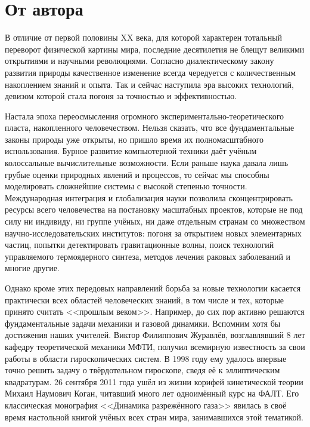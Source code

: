 \documentclass[a4paper, 12pt, oneside]{article} %
\begin{document}

\tableofcontents
\newrefsection[first]

\section*{От автора} 

В отличие от первой половины XX века, для которой характерен тотальный
переворот физической картины мира, последние десятилетия не блещут
великими открытиями и научными революциями. Согласно диалектическому
закону развития природы качественное изменение всегда чередуется с
количественным накоплением знаний и опыта. Так и сейчас наступила эра
высоких технологий, девизом которой стала погоня за точностью и
эффективностью.

Настала эпоха переосмысления огромного экспериментально-теоретического
пласта, накопленного человечеством. Нельзя сказать, что все
фундаментальные законы природы уже открыты, но пришло время их
полномасштабного использования. Бурное развитие компьютерной техники
даёт учёным колоссальные вычислительные возможности. Если раньше наука
давала лишь грубые оценки природных явлений и процессов, то сейчас мы
способны моделировать сложнейшие системы с высокой степенью точности.
Международная интеграция и глобализация науки позволила сконцентрировать
ресурсы всего человечества на постановку масштабных проектов,  которые
не под силу ни индивиду, ни группе учёных, ни даже отдельным странам со
множеством научно-исследовательских институтов: погоня за открытием
новых элементарных частиц, попытки детектировать гравитационные волны,
поиск технологий управляемого термоядерного синтеза, методов лечения
раковых заболеваний и многие другие.

Однако кроме этих передовых направлений борьба за новые технологии
касается практически всех областей человеческих знаний, в том числе и
тех, которые принято считать <<прошлым веком>>. Например, до сих пор
активно решаются фундаментальные задачи механики и газовой динамики.
Вспомним хотя бы достижения наших учителей. Виктор Филиппович Журавлёв,
возглавлявший 8 лет кафедру теоретической механики МФТИ, получил
всемирную известность за свои работы в области гироскопических систем. В
1998 году ему удалось впервые точно решить задачу о твёрдотельном
гироскопе, сведя её к эллиптическим квадратурам. 26 сентября 2011 года
ушёл из жизни корифей кинетической теории Михаил Наумович Коган,
читавший много лет одноимённый курс на ФАЛТ. Его классическая монография
<<Динамика разрежённого газа>> явилась в своё время настольной книгой
учёных всех стран мира, занимавшихся этой тематикой.
\end{document}

